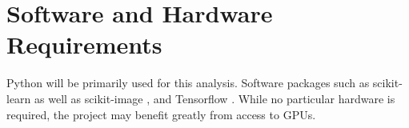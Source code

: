 \documentclass[12pt, a4paper]{article}
\begin{document}
\section*{Software and Hardware Requirements}
Python will be primarily used for this analysis. Software packages such as scikit-learn \cite{scikit-learn} as well as  scikit-image \cite{van2014scikit}, and Tensorflow \cite{tensorflow2015-whitepaper}. While no particular hardware is required, the project may benefit greatly from access to GPUs.



\end{document}
